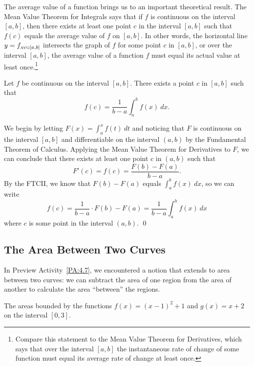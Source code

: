 The average value of a function brings us to an important theoretical result.  The Mean Value Theorem for Integrals says that if $f$ is continuous on the interval $[a,b]$, then there exists at least one point $c$ in the interval $[a,b]$ such that $f(c)$ equals the average value of $f$ on $[a,b]$.  In other words, the horizontal line $y = f_{\mbox{\tiny{AVG}}[a,b]}$ intersects the graph of $f$ for some point $c$ in $[a,b]$, or over the interval $[a,b]$, the average value of a function $f$ must equal its actual value at least once.\footnote{Compare this statement to the Mean Value Theorem for Derivatives, which says that over the interval $[a,b]$ the instantaneous rate of change of some function must equal its average rate of change at least once.}

{Let $f$  be continuous on the interval $[a,b]$.  There exists a point $c$ in $[a,b]$ such that
\[ f(c) = \frac{1}{b-a} \int_a^b f(x) \ dx. \]
} %

\proof We begin by letting $F(x) = \int_a^x f(t) \ dt$ and noticing that $F$ is continuous on the interval $[a,b]$ and differentiable on the interval $(a,b)$ by the Fundamental Theorem of Calculus.  Applying the Mean Value Theorem for Derivatives to $F$, we can conclude that there exists at least one point $c$ in $(a,b)$ such that
\[ F'(c) = f(c) = \frac{F(b) - F(a)}{b-a}. \]
By the FTCII, we know that $F(b) - F(a)$ equals $\int_a^b f(x) \ dx$, so we can write
\[ f(c) = \frac{1}{b-a} \cdot F(b) - F(a) = \frac{1}{b-a} \int_a^b f(x) \ dx \]
where $c$ is some point in the interval $(a,b)$.
\qed

\subsection*{The Area Between Two Curves} 

In Preview Activity~\ref{PA:4.7}, we encountered a notion that extends to area between two curves:  we can subtract the area of one region from the area of another to calculate the area ``between'' the regions.

\begin{marginfigure}[2cm] %
\captionsetup[subfigure]{labelformat=empty}


\caption{The areas bounded by the functions $f(x) = (x-1)^2 + 1$ and $g(x) = x+2$ on the interval $[0,3]$.} \label{fig:4-7_ABC}
\end{marginfigure}

